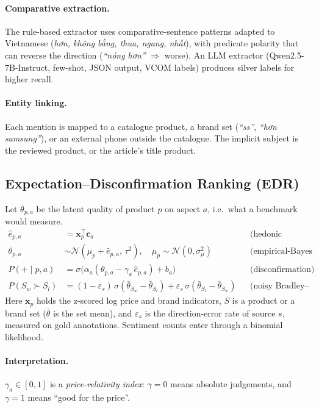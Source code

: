 \documentclass{article}
\begin{document}
\paragraph{Comparative extraction.} The rule-based extractor uses comparative-sentence patterns \citep{jindal2006} adapted to Vietnamese
(\emph{hơn, không bằng, thua, ngang, nhất}), with predicate polarity that can reverse the direction (\emph{``nóng hơn''} $\Rightarrow$ worse).
An LLM extractor (Qwen2.5-7B-Instruct, few-shot, JSON output, VCOM labels) produces silver labels for higher recall.
\paragraph{Entity linking.} Each mention is mapped to a catalogue product, a brand set (\emph{``ss''}, \emph{``hơn samsung''}), or an external phone outside the catalogue.
The implicit subject is the reviewed product, or the article's title product.

\subsection{Expectation--Disconfirmation Ranking (EDR)}
Let $\theta_{p,a}$ be the latent quality of product $p$ on aspect $a$, i.e.\ what a benchmark would measure.
\begin{align}
\hat e_{p,a} &= \mathbf{x}_p^{\top}\mathbf{c}_a && \text{(hedonic expectation)}\\
\theta_{p,a} &\sim \mathcal N(\mu_p + \hat e_{p,a},\,\tau^2),\quad \mu_p\sim\mathcal N(0,\sigma_\mu^2) && \text{(empirical-Bayes prior)}\\
P(+\mid p,a) &= \sigma\!\big(\alpha_a(\theta_{p,a}-\gamma_a\,\hat e_{p,a}) + b_a\big) && \text{(disconfirmation)}\\
P(S_w\succ S_l) &= (1-\varepsilon_s)\,\sigma(\bar\theta_{S_w}-\bar\theta_{S_l}) + \varepsilon_s\,\sigma(\bar\theta_{S_l}-\bar\theta_{S_w}) && \text{(noisy Bradley--Terry)}
\end{align}
Here $\mathbf{x}_p$ holds the z-scored log price and brand indicators, $S$ is a product or a brand set ($\bar\theta$ is the set mean), and $\varepsilon_s$ is the
direction-error rate of source $s$, measured on gold annotations. Sentiment counts enter through a binomial likelihood.
\paragraph{Interpretation.} $\gamma_a\in[0,1]$ is a \emph{price-relativity index}: $\gamma=0$ means absolute judgements, and $\gamma=1$ means ``good for the price''.
\end{document}
